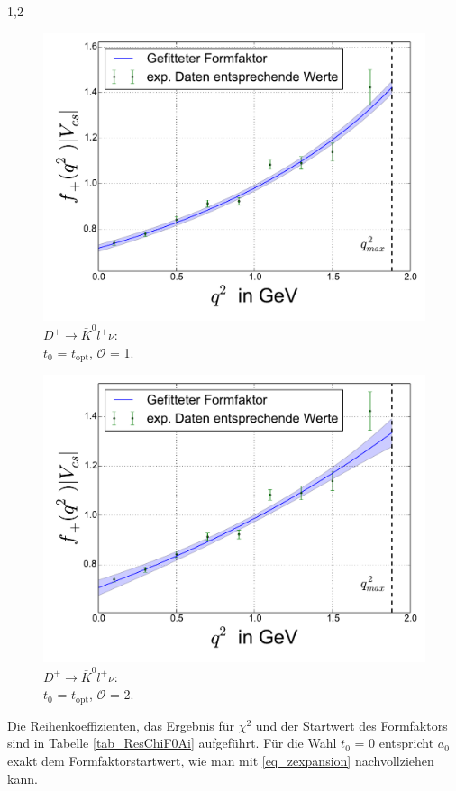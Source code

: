 \documentclass[11pt,a4paper,twoside]{report}
\begin{document}
\begin{spacing}{1,2}
 \begin{minipage}[H]{0.45\textwidth}
 \begin{figure}[H]
 \includegraphics[width=1\textwidth]{Fit/D+-1Ord-t0.pdf}
 \caption{$D^+\rightarrow \bar K^0 l^+ \nu$: \\$t_0$ = $t_{\text{opt}}$, $\mathcal{O}$ = 1.}
 \vspace{0.5cm}
 \label{pic_D+-1Ord-t0}
 \end{figure}
 \end{minipage}
 \hfill
 \begin{minipage}[H]{0.45\textwidth}
 \begin{figure}[H]
 \includegraphics[width=1\textwidth]{Fit/D+-2Ord-t0.pdf}
 \caption{$D^+\rightarrow \bar K^0 l^+ \nu$: \\$t_0$ = $t_{\text{opt}}$, $\mathcal{O}$ = 2.}
 \vspace{0.5cm}
 \label{pic_D+-2Ord-t0}
 \end{figure}
 \end{minipage}
{}
Die Reihenkoeffizienten, das Ergebnis für $\chi^2$ und der Startwert des Formfaktors sind in Tabelle \ref{tab_ResChiF0Ai} aufgeführt. Für die Wahl $t_0$ = 0 entspricht
$a_0$ exakt dem Formfaktorstartwert, wie man mit \eqref{eq_zexpansion} nachvollziehen kann.


\end{spacing}
\end{document}
